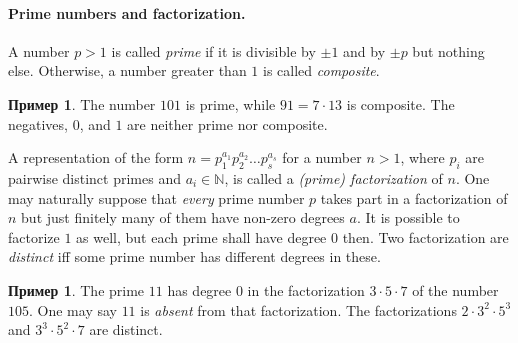 \documentclass[12pt,notitlepage]{article}
\theoremstyle{plain}
\newtheorem{lemma}[thm]{Лемма}
\theoremstyle{definition}
\newtheorem{exm}[thm]{Пример}
\theoremstyle{plain}
\newcommand{\N}{\mathbb{N}}
\newcommand{\1}{\mathbf{1}}
\newcommand{\0}{\mathbf{0}}
\newcommand{\dvd}{\mathop{\mid}}
\newcommand{\mcomm}[1]{}
\begin{document}
\paragraph{Prime numbers and factorization.} A number $p > 1$ is called \emph{prime} if it is divisible by $\pm 1$ and by $\pm p$ but nothing else. Otherwise, a number greater than $1$ is called \emph{composite}.

\begin{exm}
	The number $101$ is prime, while $91 = 7 \cdot 13$ is composite. The negatives, $0$, and $1$ are neither prime nor composite.
\end{exm}


A representation of the form $n = p_1^{a_1} p_2^{a_2} \ldots p_s^{a_s}$ for a number $n > 1$, where $p_i$ are pairwise distinct primes and $a_i \in \N$, is called a \emph{(prime) factorization} of $n$. One may naturally suppose that \emph{every} prime number $p$ takes part in a factorization of $n$ but just finitely many of them have non-zero degrees $a$. It is possible to factorize $1$ as well, but each prime shall have degree $0$ then. Two factorization are \emph{distinct} iff some prime number has different degrees in these.

\mcomm{It would be very natural to define a factorization as a function from primes to naturals with a finite support. Unfortunately, we have not enough set theory up to this point to do so. However, the students are usually happy with these ugly notions of `distinct' factorizations etc. for those are intuitive enough.}

\begin{exm}
	The prime $11$ has degree $0$ in the factorization $3 \cdot 5 \cdot 7$ of the number $105$. One may say $11$ is \emph{absent} from that factorization. The factorizations $2 \cdot 3^2 \cdot 5^3$ and $3^3 \cdot 5^2 \cdot 7$ are distinct.
\end{exm}
\end{document}
